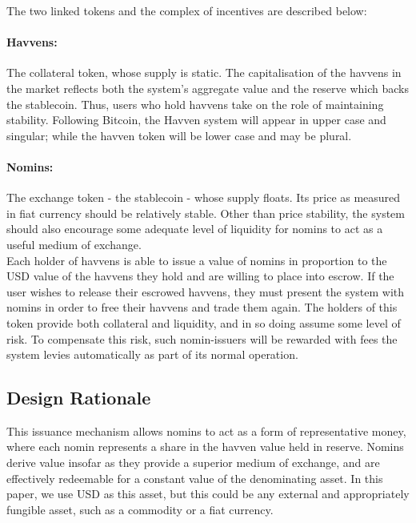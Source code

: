 \noindent The two linked tokens and the complex of incentives are described below:

\paragraph{Havvens:} The collateral token, whose supply is static.
The capitalisation of the havvens in the market reflects both the system's aggregate value and the reserve
which backs the stablecoin. Thus, users who hold havvens take on the role of maintaining stability.
Following Bitcoin, the Havven system will appear in upper case and singular; while the havven token will be lower case and may be plural.

\paragraph{Nomins:} The exchange token - the stablecoin - whose supply floats.
Its price as measured in fiat currency should be relatively stable.
Other than price stability, the system should also encourage some adequate level
of liquidity for nomins to act as a useful medium of exchange. \\

\noindent Each holder of havvens is able to issue a value of nomins in proportion to the USD value
of the havvens they hold and are willing to place into escrow. If the user wishes to release their escrowed havvens, they must
present the system with nomins in order to free their havvens and trade them again.
The holders of this token provide both collateral and liquidity, and in so doing assume some
level of risk. To compensate this risk, such nomin-issuers will be rewarded with fees the system levies
automatically as part of its normal operation. \\

\subsection{Design Rationale}

\noindent This issuance mechanism allows nomins to act as a form of representative money, where 
each nomin represents a share in the havven value held in reserve. Nomins derive value insofar as they provide
a superior medium of exchange, and are effectively redeemable for a constant value
of the denominating asset. In this paper, we use USD as this asset, but this could be any external
and appropriately fungible asset, such as a commodity or a fiat currency.  \\

